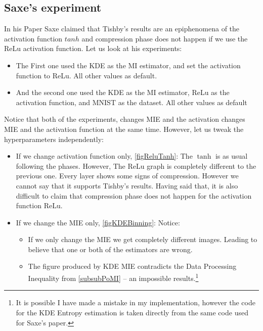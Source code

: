 \documentclass[dissertation.tex]{subfiles}
\begin{document}
\subsection{Saxe's experiment} 

In his Paper Saxe claimed that Tishby's results are an epiphenomena of the
activation function $tanh$ and compression phase does not happen if we use the
ReLu activation function. Let us look at his experiments:
\begin{itemize}
  \item{
      The First one used the KDE as the MI estimator, and set the activation
      function to ReLu. All other values as default.
    }
  \item{
      And the second one used the KDE as the MI estimator, ReLu as the
      activation function, and MNIST as the dataset. All other values as default
    }
\end{itemize}
Notice that both of the experiments, changes MIE and the activation changes MIE
and the activation function at the same time. However, let us tweak the
hyperparameters independently:
\begin{itemize}
  \item{
      If we change activation function only, \autoref{figReluTanh}: The $\tanh$
      is as usual following the phases. However, The ReLu graph is completely
      different to the previous one. Every layer shows some signs of
      compression. However we cannot say that it supports Tishby's results.
      Having said that, it is also difficult to claim that compression phase
      does not happen for the activation function ReLu.
    }
  \item{
      If we change the MIE only, \autoref{figKDEBinning}: Notice:
      \begin{itemize}
        \item{
            If we only change the MIE we get completely different images.
            Leading to believe that one or both of the estimators are wrong.
          }
        \item{
            The figure produced by KDE MIE contradicts the Data Processing
            Inequality from \autoref{subsubPoMI} -- an impossible
            results.\footnote{It is possible I have made a mistake in my
            implementation, however the code for the KDE Entropy estimation is
            taken directly from the same code used for Saxe's paper.}
          }
      \end{itemize}
      
    }
\end{itemize}
\end{document}
